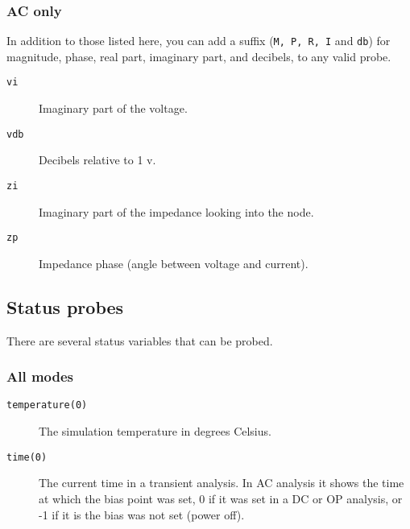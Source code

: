 \subsubsection{AC only}

In addition to those listed here, you can add a suffix ({\tt M, P, R,
I} and {\tt db}) for magnitude, phase, real part, imaginary part, and
decibels, to any valid probe.

\begin{description}

\item[{\tt vi}] Imaginary part of the voltage.

\item[{\tt vdb}] Decibels relative to 1 v.

\item[{\tt zi}] Imaginary part of the impedance looking into the node.

\item[{\tt zp}] Impedance phase (angle between voltage and current).  

\end{description}
\subsection{Status probes}

There are several status variables that can be probed.
\subsubsection{All modes}

\begin{description}

\item[{\tt temperature(0)}] The simulation temperature in degrees Celsius.

\item[{\tt time(0)}] The current time in a transient analysis.  In AC
analysis it shows the time at which the bias point was set, 0 if it was set
in a DC or OP analysis, or -1 if it is the bias was not set (power off).

\end{description}

